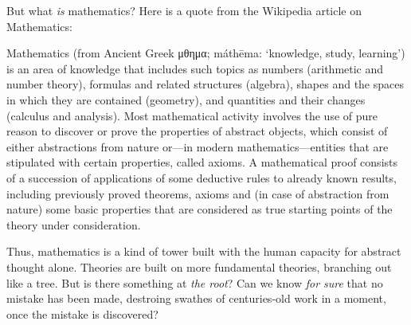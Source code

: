 But what \emph{is} mathematics?
Here is a quote from the Wikipedia article on Mathematics:\autocites{wiki:Mathematics}
\begin{displayquote}
Mathematics (from Ancient Greek μ{\textalpha}θημα; máthēma: `knowledge, study, learning') is an area of knowledge that includes such topics as numbers (arithmetic and number theory), formulas and related structures (algebra), shapes and the spaces in which they are contained (geometry), and quantities and their changes (calculus and analysis). Most mathematical activity involves the use of pure reason to discover or prove the properties of abstract objects, which consist of either abstractions from nature or---in modern mathematics---entities that are stipulated with certain properties, called axioms. A mathematical proof consists of a succession of applications of some deductive rules to already known results, including previously proved theorems, axioms and (in case of abstraction from nature) some basic properties that are considered as true starting points of the theory under consideration. 
\end{displayquote}

Thus, mathematics is a kind of tower built with the human capacity for abstract thought alone. Theories are built on more fundamental theories, branching out like a tree. But is there something at \emph{the root}? Can we know \emph{for sure} that no mistake has been made, destroing swathes of centuries-old work in a moment, once the mistake is discovered?



